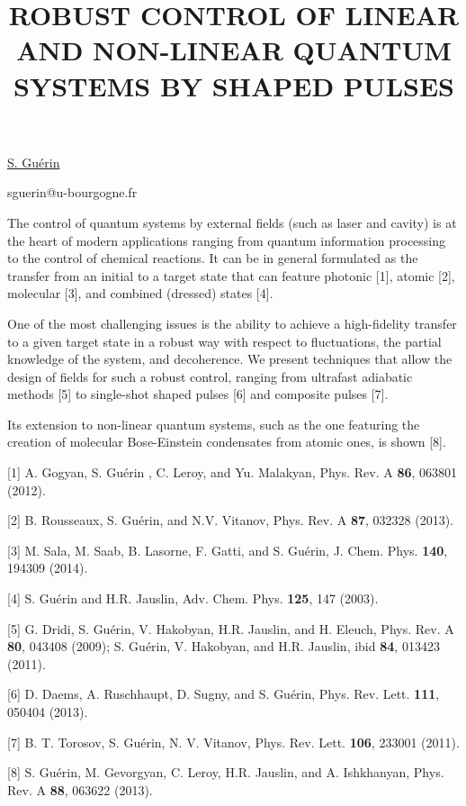 \title{ROBUST CONTROL OF LINEAR AND NON-LINEAR QUANTUM SYSTEMS BY SHAPED PULSES}

\underline{S. Gu\'erin} 

{\normalsize{\vspace{-4mm}
\dijon

\email sguerin@u-bourgogne.fr}}

The control of quantum systems by external fields (such as laser and cavity) is at the heart of modern applications ranging from
quantum information processing to the control of chemical reactions.  It can be in general formulated as the transfer from an initial
to a target state that can feature photonic [1], atomic [2], molecular [3], and combined (dressed) states [4].

One of the most challenging issues is the ability to achieve a high-fidelity transfer to a given target state in a robust way with respect
to fluctuations, the partial knowledge of the system, and decoherence. We present techniques that allow the design of fields for such
a robust control, ranging from ultrafast adiabatic methods [5] to single-shot shaped pulses [6] and composite pulses [7].

Its extension to non-linear quantum systems, such as the one featuring the creation of molecular Bose-Einstein condensates from
atomic ones, is shown [8].

{\normalsize
[1] A. Gogyan, S. Gu\'erin , C. Leroy, and Yu. Malakyan, Phys. Rev. A \textbf{86}, 063801 (2012).
\vsp

[2] B. Rousseaux, S. Gu\'erin, and N.V. Vitanov, Phys. Rev. A \textbf{87}, 032328 (2013).
\vsp

[3] M. Sala,  M. Saab, B. Lasorne, F. Gatti, and S. Gu\'erin, J. Chem. Phys. \textbf{140}, 194309 (2014).
\vsp

[4] S. Gu\'erin and H.R. Jauslin, Adv. Chem. Phys. \textbf{125}, 147 (2003).
\vsp

[5] G. Dridi, S. Gu\'erin, V. Hakobyan, H.R. Jauslin, and H. Eleuch, Phys. Rev. A \textbf{80}, 043408 (2009);
S. Gu\'erin, V. Hakobyan, and H.R. Jauslin, ibid \textbf{84}, 013423 (2011).
\vsp

[6] D. Daems, A. Ruschhaupt, D. Sugny, and S. Gu\'erin, Phys. Rev. Lett. \textbf{111}, 050404 (2013).
\vsp

[7] B. T. Torosov, S. Gu\'erin, N. V. Vitanov, Phys. Rev. Lett. \textbf{106}, 233001 (2011).
\vsp

[8] S. Gu\'erin, M. Gevorgyan, C. Leroy, H.R. Jauslin, and A. Ishkhanyan, Phys. Rev. A \textbf{88}, 063622 (2013).
}

\vspace{\baselineskip}
